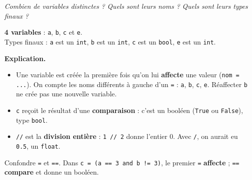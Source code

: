 \documentclass[addpoints, 11pt]{exam}
\newcommand{\enonce}[1]{\textit{#1}\par\smallskip}
\newcommand{\explication}{\par\smallskip\noindent\textbf{Explication.}\ }
\newcommand{\code}[1]{\texttt{#1}}
\DeclareRobustCommand{\_}{\textunderscore\allowbreak}
\begin{document}
\begin{questions}
\question[1\half] \enonce{Combien de variables distinctes ? Quels sont leurs noms ? Quels sont leurs types finaux ?}
\begin{reponse}
\textbf{4 variables} : \code{a}, \code{b}, \code{c} et \code{e}.\\
Types finaux : \code{a} est un \code{int}, \code{b} est un \code{int}, \code{c} est un \code{bool}, \code{e} est un \code{int}.
\end{reponse}
\explication
\begin{itemize}
  \item Une variable est créée la première fois qu'on lui \textbf{affecte} une valeur (\code{nom = ...}). On compte les noms différents à gauche d'un \code{=} : \code{a}, \code{b}, \code{c}, \code{e}. Réaffecter \code{b} ne crée pas une nouvelle variable.
  \item \code{c} reçoit le résultat d'une \textbf{comparaison} : c'est un booléen (\code{True} ou \code{False}), type \code{bool}.
  \item \code{//} est la \textbf{division entière} : \code{1 // 2} donne l'entier 0. Avec \code{/}, on aurait eu \code{0.5}, un \code{float}.
\end{itemize}

\begin{erreur}
Confondre \code{=} et \code{==}. Dans \code{c = (a == 3 and b != 3)}, le premier \code{=} \textbf{affecte} ; \code{==} \textbf{compare} et donne un booléen.
\end{erreur}


\end{questions}
\end{document}
